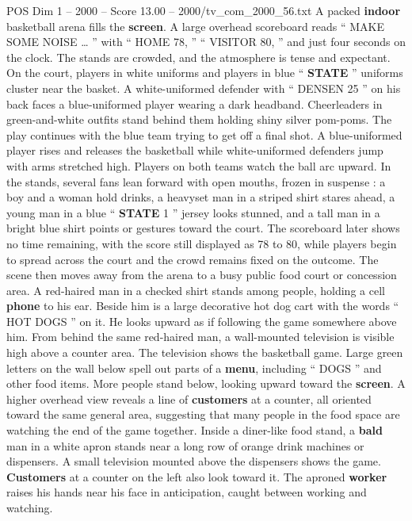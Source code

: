 \begin{textsample}{POS Dim 1 – 2000 – Score 13.00 – 2000/tv\_com\_2000\_56.txt}  \label{ex:f1_pos_035}
A packed \textbf{indoor} basketball arena fills the \textbf{screen}.
A large overhead scoreboard reads “ MAKE SOME NOISE … ” with “ HOME 78, ” “ VISITOR 80, ” and just four seconds on the clock.
The stands are crowded, and the atmosphere is tense and expectant.
On the court, players in white uniforms and players in blue “ \textbf{STATE} ” uniforms cluster near the basket.
A white-uniformed defender with “ DENSEN 25 ” on his back faces a blue-uniformed player wearing a dark headband.
Cheerleaders in green-and-white outfits stand behind them holding shiny silver pom-poms.
The play continues with the blue team trying to get off a final shot.
A blue-uniformed player rises and releases the basketball while white-uniformed defenders jump with arms stretched high.
Players on both teams watch the ball arc upward.
In the stands, several fans lean forward with open mouths, frozen in suspense : a boy and a woman hold drinks, a heavyset man in a striped shirt stares ahead, a young man in a blue “ \textbf{STATE} 1 ” jersey looks stunned, and a tall man in a bright blue shirt points or gestures toward the court.
The scoreboard later shows no time remaining, with the score still displayed as 78 to 80, while players begin to spread across the court and the crowd remains fixed on the outcome.
The scene then moves away from the arena to a busy public food court or concession area.
A red-haired man in a checked shirt stands among people, holding a cell \textbf{phone} to his ear.
Beside him is a large decorative hot dog cart with the words “ HOT DOGS ” on it.
He looks upward as if following the game somewhere above him.
From behind the same red-haired man, a wall-mounted television is visible high above a counter area.
The television shows the basketball game.
Large green letters on the wall below spell out parts of a \textbf{menu}, including “ DOGS ” and other food items.
More people stand below, looking upward toward the \textbf{screen}.
A higher overhead view reveals a line of \textbf{customers} at a counter, all oriented toward the same general area, suggesting that many people in the food space are watching the end of the game together.
Inside a diner-like food stand, a \textbf{bald} man in a white apron stands near a long row of orange drink machines or dispensers.
A small television mounted above the dispensers shows the game. \textbf{Customers} at a counter on the left also look toward it.
The aproned \textbf{worker} raises his hands near his face in anticipation, caught between working and watching.

\end{textsample}
